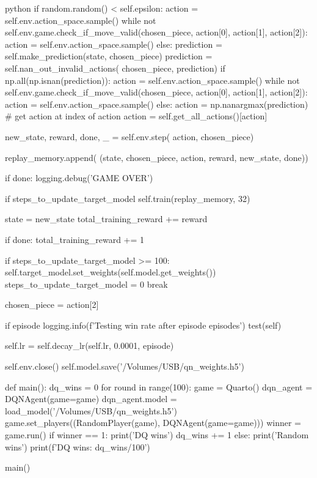 \begin{mintedbox}{python}
                if random.random() < self.epsilon:
                    action = self.env.action_space.sample()
                    while not self.env.game.check_if_move_valid(chosen_piece, action[0], action[1], action[2]):
                        action = self.env.action_space.sample()
                else:
                    prediction = self.make_prediction(state, chosen_piece)
                    prediction = self.nan_out_invalid_actions(
                        chosen_piece, prediction)
                    if np.all(np.isnan(prediction)):
                        action = self.env.action_space.sample()
                        while not self.env.game.check_if_move_valid(chosen_piece, action[0], action[1], action[2]):
                            action = self.env.action_space.sample()
                    else:
                        action = np.nanargmax(prediction)
                        # get action at index of action
                        action = self.get_all_actions()[action]

                new_state, reward, done, _ = self.env.step(
                    action, chosen_piece)

                replay_memory.append(
                    (state, chosen_piece, action, reward, new_state, done))

                if done:
                    logging.debug('GAME OVER')

                if steps_to_update_target_model %
                    self.train(replay_memory, 32)

                state = new_state
                total_training_reward += reward

                if done:
                    total_training_reward += 1

                    if steps_to_update_target_model >= 100:
                        self.target_model.set_weights(self.model.get_weights())
                        steps_to_update_target_model = 0
                    break

                chosen_piece = action[2]

            if episode %
                logging.info(f'Testing win rate after {episode} episodes')
                test(self)

            self.lr = self.decay_lr(self.lr, 0.0001, episode)

        self.env.close()
        self.model.save('/Volumes/USB/qn_weights.h5')

def main():
    dq_wins = 0
    for round in range(100):
        game = Quarto()
        dqn_agent = DQNAgent(game=game)
        dqn_agent.model = load_model('/Volumes/USB/qn_weights.h5')
        game.set_players((RandomPlayer(game), DQNAgent(game=game)))
        winner = game.run()
        if winner == 1:
            print('DQ wins')
            dq_wins += 1
        else:
            print('Random wins')
    print(f'DQ wins: {dq_wins/100}')

main()
\end{mintedbox}


